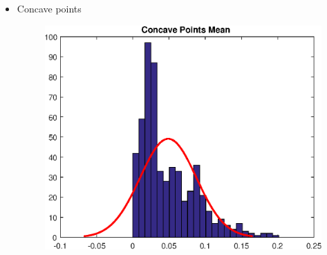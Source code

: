 \documentclass[11pt,a4paper]{article}
\numberwithin{equation}{section}
\begin{document}
\begin{itemize}
\item Concave points
\begin{figure}[H]
\centering
  \includegraphics[width=.5\linewidth]{./img/concave_points_mean}
  \label{fig:test1}
\end{figure}%


\end{itemize}
\end{document}
